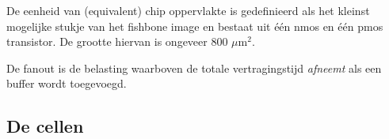 De eenheid van (equivalent) chip oppervlakte is gedefinieerd als het kleinst mogelijke stukje van het fishbone image en bestaat uit \'e\'en nmos en \'e\'en pmos transistor. De grootte hiervan is ongeveer 800 $\mu$m$^{2}$.

De fanout is de belasting waarboven de totale vertragingstijd {\it afneemt} als een buffer wordt toegevoegd.\\

\clearpage
\subsection{De cellen}












%





\cleardoublepage

